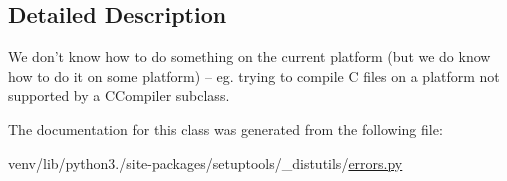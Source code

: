 \subsection{Detailed Description}
\begin{DoxyVerb}We don't know how to do something on the current platform (but
we do know how to do it on some platform) -- eg. trying to compile
C files on a platform not supported by a CCompiler subclass.\end{DoxyVerb}
 

The documentation for this class was generated from the following file\+:\begin{DoxyCompactItemize}
\item 
venv/lib/python3./site-\/packages/setuptools/\+\_\+distutils/\hyperlink{__distutils_2errors_8py}{errors.\+py}\end{DoxyCompactItemize}
